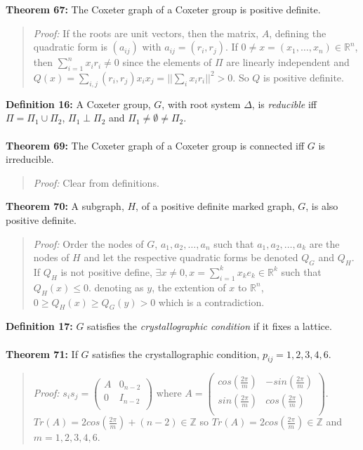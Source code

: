 {\bf Theorem 67:}
The Coxeter graph of a Coxeter group is positive definite.
\begin{quote}
\emph{Proof:}
If the roots are unit vectors,
then the matrix, $A$, defining the quadratic form is $(a_{ij})$ with
$a_{ij}= (r_i, r_j)$.  If $0 \ne x= (x_1, \ldots, x_n) \in {\mathbb R}^n$, then
$\sum_{i=1}^n x_i r_i \ne 0$ since the elements of $\Pi$ are linearly independent
and $Q(x)= \sum_{i,j} (r_i, r_j) x_i x_j = || \sum_i x_i r_i ||^2>0$.  So
$Q$ is positive definite.
\end{quote}
{\bf Definition 16:}
A Coxeter group, $G$, with root system $\Delta$, is \emph{reducible} iff
$\Pi= \Pi_1 \cup \Pi_2$, $\Pi_1 \perp \Pi_2$ and $\Pi_1 \ne \emptyset \ne \Pi_2$.
\\
\\
{\bf Theorem 69:}
The Coxeter graph of a Coxeter group is connected iff $G$ is irreducible.
\begin{quote}
\emph{Proof:}  Clear from definitions.
\end{quote}
{\bf Theorem 70:}  A subgraph, $H$, of a positive definite marked graph, $G$, is also positive
definite.
\begin{quote}
\emph{Proof:}
Order the nodes of $G$, 
$a_1, a_2 , \ldots, a_n$ such that
$a_1, a_2 , \ldots, a_k$ are the nodes of $H$ and let the respective quadratic
forms be denoted $Q_G$ and $Q_H$.  If $Q_H$ is not positive define,
$\exists x \ne 0, x= \sum_{i=1}^k x_k e_k \in {\mathbb R}^k$ such that $Q_H(x) \le 0$.
denoting as $y$, the extention of
$x$ to ${\mathbb R}^n$, $0 \ge Q_H(x) \ge Q_G(y) > 0$ which is a contradiction.
\end{quote}
{\bf Definition 17:}
$G$ satisfies the \emph{crystallographic condition} if it fixes a lattice.
\\
\\
{\bf Theorem 71:}
If $G$ satisfies the crystallographic condition, $p_{ij}= 1,2,3,4,6$.
\begin{quote}
\emph{Proof:} 
$s_i s_j=
\left(
\begin{array}{cc}
A &  0_{n-2} \\
0  &  I_{n-2} \\
\end{array}
\right)$ where
$A=
\left(
\begin{array}{cc}
cos({\frac {2 \pi} {m}}) & -sin({\frac {2 \pi} {m}}) \\
sin({\frac {2 \pi} {m}}) & cos({\frac {2 \pi} {m}}) \\
\end{array}
\right)$.  $Tr(A)= 2 cos({\frac {2 \pi} {m}}) + (n-2) \in {\mathbb Z}$ so
$Tr(A)= 2 cos({\frac {2 \pi} {m}}) \in {\mathbb Z}$ and $m= 1, 2, 3, 4, 6$.
\end{quote}
